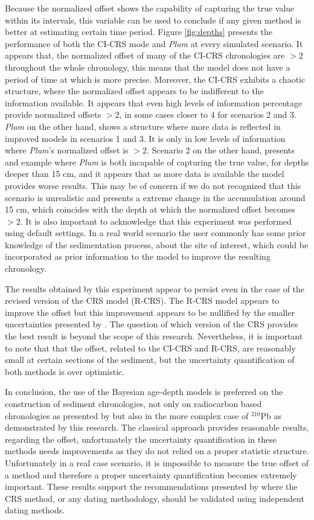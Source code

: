 \documentclass [10pt] {article}
\begin{document}
Because the normalized offset shows the capability of capturing the true value within its intervals, this variable can be used to conclude if any given method is better at estimating certain time period.
Figure \ref{fig:depths} presents the performance of both the CI-CRS mode and \textit{Plum} at every simulated scenario.
It appears that, the normalized offset of many of the CI-CRS chronologies are $> 2$ throughout the whole chronology, this means that the model does not have a period of time at which is more precise. 
Moreover, the CI-CRS exhibits a chaotic structure, where the normalized offset appears to be indifferent to the information available.
It appears that even high levels of information percentage provide normalized offsets $> 2$, in some cases closer to 4 for scenarios 2 and 3.
\textit{Plum} on the other hand, shows a structure where more data is reflected in improved models in scenarios 1 and 3.
It is only in low levels of information where \textit{Plum}'s normalized offset is $>2$.
Scenario 2 on the other hand, presents and example where \textit{Plum} is both incapable of capturing the true value, for depths deeper than 15 cm, and it appears that as more data is available the model provides worse results. 
This may be of concern if we do not recognized that this scenario is unrealistic and presents a extreme change in the accumulation around 15 cm, which coincides with the depth at which the normalized offset becomes $>2$.
It is also important to acknowledge that this experiment was performed using default settings.  In a real world scenario the user commonly has some prior knowledge of the sedimentation process, about the site of interest, which could be incorporated as prior information to the model to improve the resulting chronology.

The results obtained by this experiment appear to persist even in the case of the revised version of the CRS model (R-CRS).
The R-CRS model appears to improve the offset but this improvement appears to be nullified by the smaller uncertainties presented by \citet{Sanchez-Cabeza2014}.
The question of which version of the CRS provides the best result is beyond the scope of this research.
Nevertheless, it is important to note that that the offset, related to the CI-CRS and R-CRS, are reasonably small at certain sections of the sediment, but the uncertainty quantification of both methods is over optimistic.  

In conclusion, the use of the Bayesian age-depth models is preferred on the construction of sediment chronologies, not only on radiocarbon based chronologies as presented by \citet{Blaauw2018} but also in the more complex case of $^{210}$Pb as demonstrated by this research.
The classical approach provides reasonable results, regarding the offset, unfortunately the uncertainty quantification in these methods needs improvements as they do not relied on a proper statistic structure. 
Unfortunately in a real case scenario, it is impossible to measure the true offset of a method and therefore a proper uncertainty quantification becomes extremely important.
These results support the recommendations presented by \citet{Smith2001,Barsanti2020} where the CRS method, or any dating methodology, should be validated using independent dating methods. 
\end{document}
